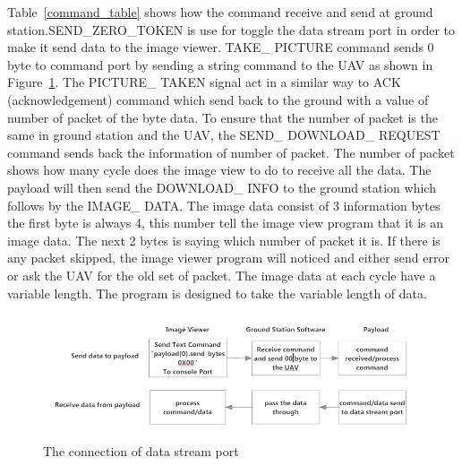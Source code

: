 Table~\ref{command_table} shows how the command receive and send at ground station.SEND\_ZERO\_TOKEN is use for toggle the data stream port in order to make it send data to the image viewer. TAKE\_ PICTURE command sends 0 byte to command port by sending a string command to the UAV as shown in Figure~\ref{GCS_Payload_comm}. The PICTURE\_ TAKEN signal act in a similar way to ACK (acknowledgement) command which send back to the ground with a value of number of packet of the byte data. To ensure that the number of packet is the same in ground station and the UAV, the SEND\_ DOWNLOAD\_ REQUEST command sends back the information of number of packet. The number of packet shows how many cycle does the image view to do to receive all the data.  The payload will then send the DOWNLOAD\_ INFO to the ground station which follows by the IMAGE\_ DATA. The image data consist of 3 information bytes the first byte is always 4, this number tell the image view program that it is an image data. The next 2 bytes is saying which number of packet it is. If there is any packet skipped, the image viewer program will noticed and either send error or ask the UAV for the old set of packet. The image data at each cycle have a variable length. The program is designed to take the variable length of data.

\begin{figure}[H]
\begin{center}
\includegraphics[scale=0.6]{figures/GCS_Payload_communication.png} 
\caption{The connection of data stream port\label{GCS_Payload_comm}}
\end{center}
\end{figure}

